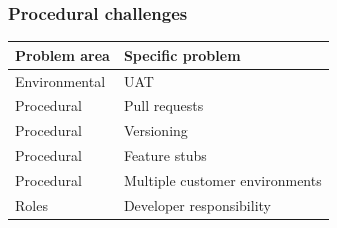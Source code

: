 \documentclass[english]{tktltiki2}
\theoremstyle{definition}
\theoremstyle{remark}
\begin{document}






\subsubsection{Procedural challenges}

\begin{center}
    \begin{tabular}{ | l | p{5cm} |}
    \hline
    Problem area & Specific problem \\ \hline
    Environmental & UAT \\ \hline
   	Procedural & Pull requests \\ \hline
	Procedural & Versioning \\ \hline
	Procedural & Feature stubs \\ \hline
	Procedural & Multiple customer environments \\ \hline
	Roles & Developer responsibility \\
    \hline
    \end{tabular}
\end{center}
\end{document}
